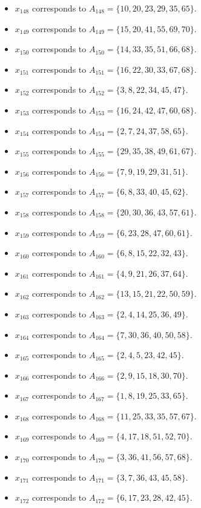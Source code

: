 \documentclass[11pt]{article}
\begin{document}
\begin{itemize}
\item $x_{148}$ corresponds to $A_{148}=\{10, 20, 23, 29, 35, 65\}$.
\item $x_{149}$ corresponds to $A_{149}=\{15, 20, 41, 55, 69, 70\}$.
\item $x_{150}$ corresponds to $A_{150}=\{14, 33, 35, 51, 66, 68\}$.
\item $x_{151}$ corresponds to $A_{151}=\{16, 22, 30, 33, 67, 68\}$.
\item $x_{152}$ corresponds to $A_{152}=\{3, 8, 22, 34, 45, 47\}$.
\item $x_{153}$ corresponds to $A_{153}=\{16, 24, 42, 47, 60, 68\}$.
\item $x_{154}$ corresponds to $A_{154}=\{2, 7, 24, 37, 58, 65\}$.
\item $x_{155}$ corresponds to $A_{155}=\{29, 35, 38, 49, 61, 67\}$.
\item $x_{156}$ corresponds to $A_{156}=\{7, 9, 19, 29, 31, 51\}$.
\item $x_{157}$ corresponds to $A_{157}=\{6, 8, 33, 40, 45, 62\}$.
\item $x_{158}$ corresponds to $A_{158}=\{20, 30, 36, 43, 57, 61\}$.
\item $x_{159}$ corresponds to $A_{159}=\{6, 23, 28, 47, 60, 61\}$.
\item $x_{160}$ corresponds to $A_{160}=\{6, 8, 15, 22, 32, 43\}$.
\item $x_{161}$ corresponds to $A_{161}=\{4, 9, 21, 26, 37, 64\}$.
\item $x_{162}$ corresponds to $A_{162}=\{13, 15, 21, 22, 50, 59\}$.
\item $x_{163}$ corresponds to $A_{163}=\{2, 4, 14, 25, 36, 49\}$.
\item $x_{164}$ corresponds to $A_{164}=\{7, 30, 36, 40, 50, 58\}$.
\item $x_{165}$ corresponds to $A_{165}=\{2, 4, 5, 23, 42, 45\}$.
\item $x_{166}$ corresponds to $A_{166}=\{2, 9, 15, 18, 30, 70\}$.
\item $x_{167}$ corresponds to $A_{167}=\{1, 8, 19, 25, 33, 65\}$.
\item $x_{168}$ corresponds to $A_{168}=\{11, 25, 33, 35, 57, 67\}$.
\item $x_{169}$ corresponds to $A_{169}=\{4, 17, 18, 51, 52, 70\}$.
\item $x_{170}$ corresponds to $A_{170}=\{3, 36, 41, 56, 57, 68\}$.
\item $x_{171}$ corresponds to $A_{171}=\{3, 7, 36, 43, 45, 58\}$.
\item $x_{172}$ corresponds to $A_{172}=\{6, 17, 23, 28, 42, 45\}$.

\end{itemize}
\end{document}
